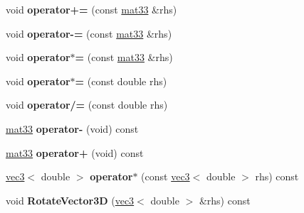 \begin{DoxyCompactItemize}
\item 
\hypertarget{classmath_1_1mat33_a2635460baa172b427e9115e66ec09a98}{
void {\bfseries operator+=} (const \hyperlink{classmath_1_1mat33}{mat33} \&rhs)}
\label{classmath_1_1mat33_a2635460baa172b427e9115e66ec09a98}

\item 
\hypertarget{classmath_1_1mat33_a0679ff839e7352a26ae02562c868d29e}{
void {\bfseries operator-\/=} (const \hyperlink{classmath_1_1mat33}{mat33} \&rhs)}
\label{classmath_1_1mat33_a0679ff839e7352a26ae02562c868d29e}

\item 
\hypertarget{classmath_1_1mat33_afd081a8e32feff6d0d0eb438d3d83cb2}{
void {\bfseries operator$\ast$=} (const \hyperlink{classmath_1_1mat33}{mat33} \&rhs)}
\label{classmath_1_1mat33_afd081a8e32feff6d0d0eb438d3d83cb2}

\item 
\hypertarget{classmath_1_1mat33_a9daba0ec147864bc263848cefa9bf98a}{
void {\bfseries operator$\ast$=} (const double rhs)}
\label{classmath_1_1mat33_a9daba0ec147864bc263848cefa9bf98a}

\item 
\hypertarget{classmath_1_1mat33_a5aa053c89065b138e75c708b44a36f15}{
void {\bfseries operator/=} (const double rhs)}
\label{classmath_1_1mat33_a5aa053c89065b138e75c708b44a36f15}

\item 
\hypertarget{classmath_1_1mat33_a62a0f41af31620230e3fc77693aabfd3}{
\hyperlink{classmath_1_1mat33}{mat33} {\bfseries operator-\/} (void) const }
\label{classmath_1_1mat33_a62a0f41af31620230e3fc77693aabfd3}

\item 
\hypertarget{classmath_1_1mat33_a94fb232001ecafebb4cfd621aaf51108}{
\hyperlink{classmath_1_1mat33}{mat33} {\bfseries operator+} (void) const }
\label{classmath_1_1mat33_a94fb232001ecafebb4cfd621aaf51108}

\item 
\hypertarget{classmath_1_1mat33_a316deed9a5d426ba17a2a39fde012883}{
\hyperlink{classmath_1_1vec3}{vec3}$<$ double $>$ {\bfseries operator$\ast$} (const \hyperlink{classmath_1_1vec3}{vec3}$<$ double $>$ rhs) const }
\label{classmath_1_1mat33_a316deed9a5d426ba17a2a39fde012883}

\item 
\hypertarget{classmath_1_1mat33_a8d63113c1f57be9f2961d543103a5d30}{
void {\bfseries RotateVector3D} (\hyperlink{classmath_1_1vec3}{vec3}$<$ double $>$ \&rhs) const }
\label{classmath_1_1mat33_a8d63113c1f57be9f2961d543103a5d30}


\end{DoxyCompactItemize}
